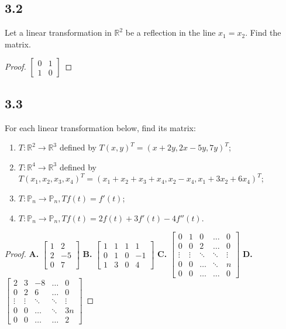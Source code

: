 \documentclass{amsart}
\begin{document}
\subsection*{3.2} Let a linear transformation in $\mathbb{R}^2$ be a reflection in the line $x_1 = x_2$. Find the matrix.
\begin{proof}
    $\begin{bmatrix}
        0 & 1 \\ 1 & 0
    \end{bmatrix}$
\end{proof}
\subsection*{3.3} For each linear transformation below, find its matrix:
\begin{enumerate}[label=\alph*)]
\item $T: \mathbb{R}^2 \rightarrow \mathbb{R}^3$ defined by $T(x,y)^T = (x+2y, 2x-5y, 7y)^T$;
\item $T : \mathbb{R}^4 \rightarrow \mathbb{R}^3$ defined by $T(x_1,x_2,x_3,x_4)^T = (x_1 +x_2 +x_3 + x_4, x_2 - x_4, x_1 + 3x_2 + 6x_4)^T$;
\item $T : \mathbb{P}_n \rightarrow \mathbb{P}_n, Tf(t) = f'(t)$;
\item $T : \mathbb{P}_n \rightarrow \mathbb{P}_n, Tf(t) = 2f(t)+3f'(t)-4f''(t)$.
\end{enumerate}
\begin{proof}
    \textbf{A.} $\begin{bmatrix} 1 & 2 \\ 2 & -5 \\ 0 & 7  \end{bmatrix}$
    \textbf{B.} $\begin{bmatrix} 1 & 1 & 1 & 1 \\ 0 & 1 & 0 & -1 \\ 1 & 3 & 0 & 4 \end{bmatrix}$
    \textbf{C.} $\begin{bmatrix} 0 & 1 & 0 & \ldots & 0 \\ 0 & 0 & 2 & \ldots  & 0 \\ \vdots & \vdots & \ddots & \ddots & \vdots \\ 0 & 0 & \ldots & \ddots & n \\ 0& 0 & \ldots & \ldots & 0 \end{bmatrix}$
    \textbf{D.} $\begin{bmatrix} 2 & 3 & -8 & \ldots & 0 \\ 0 & 2 & 6 & \ldots  & 0 \\ \vdots & \vdots & \ddots & \ddots & \vdots \\ 0 & 0 & \ldots & \ddots & 3n \\ 0& 0 & \ldots & \ldots & 2 \end{bmatrix}$
\end{proof}
\end{document}
